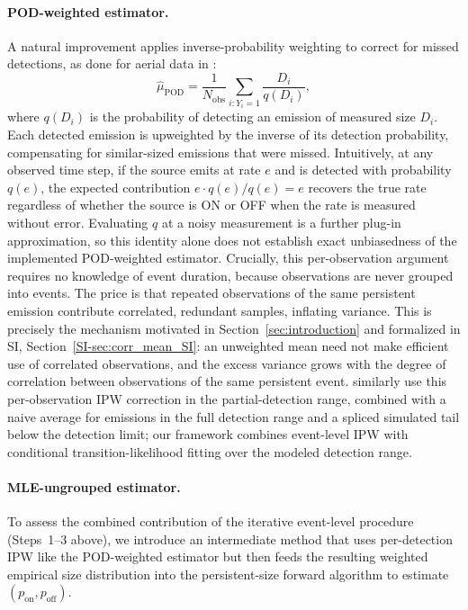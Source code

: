 \documentclass[numsec,webpdf,modern,mediumone]{oup-authoring-template}
\newcommand{\new}[1]{#1}
\begin{document}
\paragraph{POD-weighted estimator.}
A natural improvement applies inverse-probability weighting to correct for missed detections, as done for aerial data in \citet{Sherwin2024Nature}:
\begin{equation}
    \hat{\mu}_{\text{POD}} = \frac{1}{N_{\text{obs}}} \sum_{i: Y_i = 1} \frac{D_i}{q(D_i)},
\end{equation}
where $q(D_i)$ is the probability of detecting an emission of measured size $D_i$. Each detected emission is upweighted by the inverse of its detection probability, compensating for similar-sized emissions that were missed. Intuitively, at any observed time step, if the source emits at rate $e$ and is detected with probability $q(e)$, the expected contribution $e \cdot q(e) / q(e) = e$ recovers the true rate regardless of whether the source is ON or OFF when the rate is measured without error. Evaluating $q$ at a noisy measurement is a further plug-in approximation, so this identity alone does not establish exact unbiasedness of the implemented POD-weighted estimator. Crucially, this per-observation argument requires no knowledge of event duration, because observations are never grouped into events. The price is that repeated observations of the same persistent emission contribute correlated, redundant samples, inflating variance. \new{This is precisely the mechanism motivated in Section~\ref{sec:introduction} and formalized in SI, Section~\ref{SI-sec:corr_mean_SI}: an unweighted mean need not make efficient use of correlated observations, and the excess variance grows with the degree of correlation between observations of the same persistent event. \citet{Sherwin2024Nature} similarly use this per-observation IPW correction in the partial-detection range, combined with a naive average for emissions in the full detection range and a spliced simulated tail below the detection limit; our framework combines event-level IPW with conditional transition-likelihood fitting over the modeled detection range.}

\paragraph{MLE-ungrouped estimator.}
To assess the combined contribution of the iterative event-level procedure (Steps~1--3 above), we introduce an intermediate method that uses per-detection IPW like the POD-weighted estimator but then feeds the resulting weighted empirical size distribution into the persistent-size forward algorithm to estimate $(p_{\text{on}}, p_{\text{off}})$.
\end{document}
